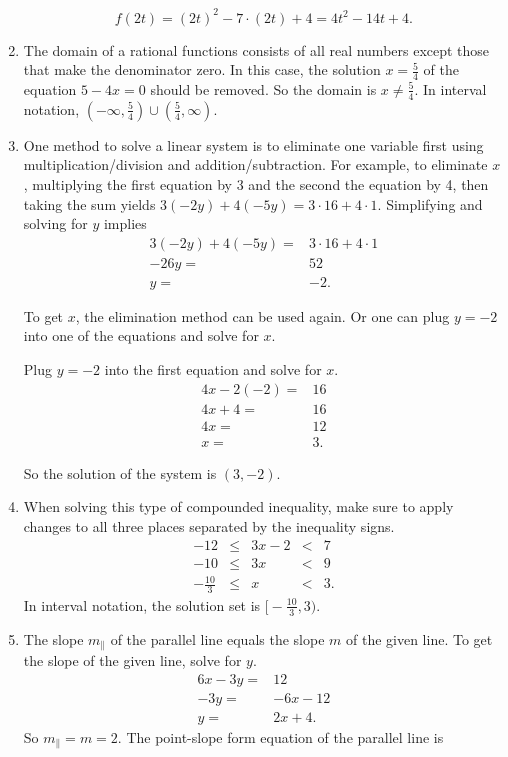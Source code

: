 \documentclass[
  12pt]{article}
\begin{document}
\begin{enumerate}
  \[f(2t)=(2t)^2-7\cdot (2t) + 4=4t^2-14t+4.\]
\item
  The domain of a rational functions consists of all real numbers except
  those that make the denominator zero. In this case, the solution
  \(x=\frac54\) of the equation \(5-4x=0\) should be removed. So the
  domain is \(x\neq\frac54\). In interval notation,
  \((-\infty, \frac54)\cup(\frac54,\infty)\).
\item
  One method to solve a linear system is to eliminate one variable first
  using multiplication/division and addition/subtraction. For example,
  to eliminate \(x\), multiplying the first equation by 3 and the second
  the equation by 4, then taking the sum yields
  \(3(-2y)+4(-5y)=3\cdot 16+4\cdot 1\). Simplifying and solving for
  \(y\) implies \[
  \begin{aligned}
  3(-2y)+4(-5y)=&3\cdot 16+4\cdot 1\\
  -26y=&52\\
  y=&-2.
  \end{aligned}
  \]

  To get \(x\), the elimination method can be used again. Or one can
  plug \(y=-2\) into one of the equations and solve for \(x\).

  Plug \(y=-2\) into the first equation and solve for \(x\). \[
  \begin{aligned}
  4x-2(-2)=&16\\
  4x+4=&16\\
  4x=&12\\
  x=&3.
  \end{aligned}
  \]

  So the solution of the system is \((3, -2)\).
\item
  When solving this type of compounded inequality, make sure to apply
  changes to all three places separated by the inequality signs. \[
  \begin{array}{rcccl}
  -12 &\le& 3x-2 &<&7\\
  -10 &\le& 3x &<&9\\
  -\frac{10}{3}&\le& x &<&3.
  \end{array}
  \] In interval notation, the solution set is
  \(\big[-\frac{10}{3}, 3\big)\).
\item
  The slope \(m_{\parallel}\) of the parallel line equals the slope
  \(m\) of the given line. To get the slope of the given line, solve for
  \(y\). \[
  \begin{aligned}
  6x-3y=&12\\
  -3y=&-6x-12\\
  y=&2x+4.
  \end{aligned}
  \] So \(m_\parallel=m=2\). The point-slope form equation of the
  parallel line is


\end{enumerate}
\end{document}

